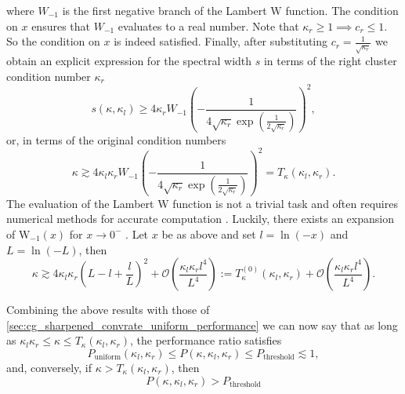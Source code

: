 where $W_{-1}$ is the first negative branch of the Lambert $\mathrm{W}$ function. The condition on $x$ ensures that $W_{-1}$ evaluates to a real number. Note that $\kappa_r\geq1 \implies c_r \leq 1$. So the condition on $x$ is indeed satisfied. Finally, after substituting $c_r = \frac{1}{\sqrt{\kappa_r}}$ we obtain an explicit expression for the spectral width $s$ in terms of the right cluster condition number $\kappa_r$
\[
    s(\kappa, \kappa_l) \geq 4\kappa_r W_{-1}\left(-\frac{1}{4\sqrt{\kappa_r}\exp\left(\frac{1}{2\sqrt{\kappa_r}}\right)}\right)^2,
\]
or, in terms of the original condition numbers
\begin{equation}
    \kappa \gtrsim 4\kappa_l\kappa_r W_{-1}\left(-\frac{1}{4\sqrt{\kappa_r}\exp\left(\frac{1}{2\sqrt{\kappa_r}}\right)}\right)^2 = T_{\kappa}(\kappa_l, \kappa_r).
    \label{eq:threshold_inequality_explicit}    
\end{equation}
The evaluation of the Lambert $\mathrm{W}$ function is not a trivial task and often requires numerical methods for accurate computation \cite{evaluation_of_the_lambert_w_function_Corless1996}. Luckily, there exists an expansion of $\mathrm{W}_{-1}(x)$ for $x\rightarrow0^-$ \cite[Equation 4.19]{evaluation_of_the_lambert_w_function_Corless1996}. Let $x$ be as above and set $l = \ln(-x)$ and $L = \ln(-L)$, then
\begin{equation}
    \kappa \gtrsim 4\kappa_l\kappa_r \left(L - l + \frac{l}{L}\right)^2 + \mathcal{O}\left(\frac{\kappa_l\kappa_rl^4}{L^4}\right) := T^{(0)}_{\kappa}(\kappa_l, \kappa_r) + \mathcal{O}\left(\frac{\kappa_l\kappa_rl^4}{L^4}\right).
    \label{eq:threshold_inequality_explicit_expansion}    
\end{equation}

Combining the above results with those of \cref{sec:cg_sharpened_convrate_uniform_performance} we can now say that as long as $\kappa_l\kappa_r \leq \kappa \leq T_{\kappa}(\kappa_l, \kappa_r)$, the performance ratio satisfies
\begin{equation}
    P_{\text{uniform}}(\kappa_l, \kappa_r) \leq P(\kappa, \kappa_l, \kappa_r) \leq P_{\text{threshold}} \lesssim 1,
    \label{eq:performance_bounds}
\end{equation}
and, conversely, if $\kappa > T_{\kappa}(\kappa_l, \kappa_r)$, then 
\[
    P(\kappa, \kappa_l, \kappa_r) > P_{\text{threshold}}
\]

